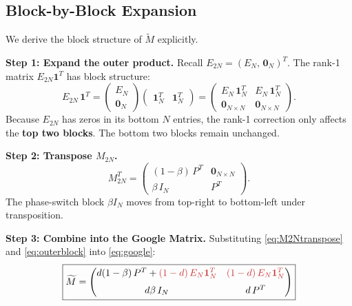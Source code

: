\documentclass[12pt,a4paper]{article}
\theoremstyle{definition}
\theoremstyle{plain}
\begin{document}
\subsection{Block-by-Block Expansion}

We derive the block structure of $\widetilde{M}$ explicitly.

\medskip
\noindent\textbf{Step 1: Expand the outer product.}
Recall $E_{2N} = (E_N,\, \bm{0}_N)^T$. The rank-1 matrix $E_{2N}\bm{1}^T$ has
block structure:
\begin{equation}
  E_{2N}\,\bm{1}^T
  = \begin{pmatrix} E_N \\ \bm{0}_N \end{pmatrix}
    \begin{pmatrix} \bm{1}_N^T & \bm{1}_N^T \end{pmatrix}
  = \begin{pmatrix}
      E_N\,\bm{1}_N^T & E_N\,\bm{1}_N^T \\[4pt]
      \bm{0}_{N\times N}    & \bm{0}_{N\times N}
    \end{pmatrix}.
  \label{eq:outerblock}
\end{equation}
Because $E_{2N}$ has zeros in its bottom $N$ entries, the rank-1 correction only affects
the \textbf{top two blocks}. The bottom two blocks remain unchanged.

\medskip
\noindent\textbf{Step 2: Transpose $M_{2N}$.}
\begin{equation}
  M_{2N}^T =
  \begin{pmatrix}
  (1-\beta)\,P^T & \bm{0}_{N\times N} \\[4pt]
  \beta\,I_N     & P^T
  \end{pmatrix}.
  \label{eq:M2Ntranspose}
\end{equation}
The phase-switch block $\beta I_N$ moves from top-right to bottom-left under transposition.

\medskip
\noindent\textbf{Step 3: Combine into the Google Matrix.}
Substituting \eqref{eq:M2Ntranspose} and \eqref{eq:outerblock} into \eqref{eq:google}:
\begin{equation}
  \boxed{
  \widetilde{M} =
  \begin{pmatrix}
  d(1-\beta)\,P^T + {\color{accent}(1-d)\,E_N\bm{1}_N^T}
    & {\color{accent}(1-d)\,E_N\bm{1}_N^T} \\[6pt]
  d\beta\, I_N
    & d\,P^T
  \end{pmatrix}
  }
  \label{eq:googleblocks}
\end{equation}
\end{document}

